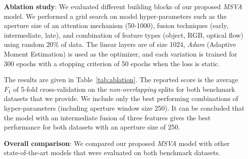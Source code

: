 \documentclass{article}
\begin{document}
\textbf{Ablation study}: We evaluated different building blocks of our proposed \textit{MSVA} model. We performed a grid search on model hyper-parameters such as the aperture size of an attention mechanism (\num{50}-\num{1000}), fusion techniques (early, intermediate, late), and combination of feature types (object, RGB, optical flow) using random \num{20}\% of data. 
The linear layers are of size \num{1024}, \emph{Adam} (Adaptive Moment Estimation) is used as the optimizer, and each variation is trained for \num{300} epochs with a stopping criterion of 50 epochs when the loss is static.


The results are given in Table~\ref{tab:ablation}. 
The reported score is the average $F_1$ of 5-fold cross-validation on the \textit{non-overlapping} splits for both benchmark datasets that we provide. We include only the best performing combinations of hyper-parameters (including aperture window size 250). It can be concluded that the model with an intermediate fusion of three features gives the best performance for both datasets with an aperture size of \num{250}.
																											   
											 

																													 
			  

																																																																																																																																																																																																																																																																																						  
					
																																																																	 

\textbf{Overall comparison}: We compared our proposed \textit{MSVA} model with other state-of-the-art models that were evaluated on both benchmark datasets. 
																				
\end{document}

